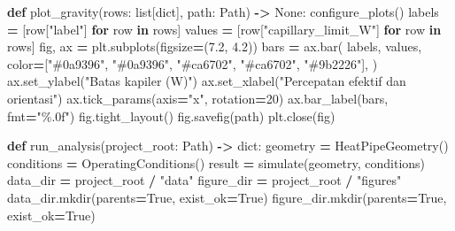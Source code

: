\documentclass[
  12pt,a4paper,oneside]{report}
\newenvironment{Shaded}{\begin{snugshade}}{\end{snugshade}}
\newcommand{\BuiltInTok}[1]{#1}
\newcommand{\ControlFlowTok}[1]{\textcolor[rgb]{0.13,0.29,0.53}{\textbf{#1}}}
\newcommand{\DecValTok}[1]{\textcolor[rgb]{0.00,0.00,0.81}{#1}}
\newcommand{\FloatTok}[1]{\textcolor[rgb]{0.00,0.00,0.81}{#1}}
\newcommand{\KeywordTok}[1]{\textcolor[rgb]{0.13,0.29,0.53}{\textbf{#1}}}
\newcommand{\NormalTok}[1]{#1}
\newcommand{\OperatorTok}[1]{\textcolor[rgb]{0.81,0.36,0.00}{\textbf{#1}}}
\newcommand{\StringTok}[1]{\textcolor[rgb]{0.31,0.60,0.02}{#1}}
\newcommand{\VariableTok}[1]{\textcolor[rgb]{0.00,0.00,0.00}{#1}}
\begin{document}
\begin{Shaded}
\begin{Highlighting}[]
\KeywordTok{def}\NormalTok{ plot\_gravity(rows: }\BuiltInTok{list}\NormalTok{[}\BuiltInTok{dict}\NormalTok{], path: Path) }\OperatorTok{{-}\textgreater{}} \VariableTok{None}\NormalTok{:}
\NormalTok{    configure\_plots()}
\NormalTok{    labels }\OperatorTok{=}\NormalTok{ [row[}\StringTok{"label"}\NormalTok{] }\ControlFlowTok{for}\NormalTok{ row }\KeywordTok{in}\NormalTok{ rows]}
\NormalTok{    values }\OperatorTok{=}\NormalTok{ [row[}\StringTok{"capillary\_limit\_W"}\NormalTok{] }\ControlFlowTok{for}\NormalTok{ row }\KeywordTok{in}\NormalTok{ rows]}
\NormalTok{    fig, ax }\OperatorTok{=}\NormalTok{ plt.subplots(figsize}\OperatorTok{=}\NormalTok{(}\FloatTok{7.2}\NormalTok{, }\FloatTok{4.2}\NormalTok{))}
\NormalTok{    bars }\OperatorTok{=}\NormalTok{ ax.bar(}
\NormalTok{        labels, values,}
\NormalTok{        color}\OperatorTok{=}\NormalTok{[}\StringTok{"\#0a9396"}\NormalTok{, }\StringTok{"\#0a9396"}\NormalTok{, }\StringTok{"\#ca6702"}\NormalTok{, }\StringTok{"\#ca6702"}\NormalTok{, }\StringTok{"\#9b2226"}\NormalTok{],}
\NormalTok{    )}
\NormalTok{    ax.set\_ylabel(}\StringTok{"Batas kapiler (W)"}\NormalTok{)}
\NormalTok{    ax.set\_xlabel(}\StringTok{"Percepatan efektif dan orientasi"}\NormalTok{)}
\NormalTok{    ax.tick\_params(axis}\OperatorTok{=}\StringTok{"x"}\NormalTok{, rotation}\OperatorTok{=}\DecValTok{20}\NormalTok{)}
\NormalTok{    ax.bar\_label(bars, fmt}\OperatorTok{=}\StringTok{"\%.0f"}\NormalTok{)}
\NormalTok{    fig.tight\_layout()}
\NormalTok{    fig.savefig(path)}
\NormalTok{    plt.close(fig)}


\KeywordTok{def}\NormalTok{ run\_analysis(project\_root: Path) }\OperatorTok{{-}\textgreater{}} \BuiltInTok{dict}\NormalTok{:}
\NormalTok{    geometry }\OperatorTok{=}\NormalTok{ HeatPipeGeometry()}
\NormalTok{    conditions }\OperatorTok{=}\NormalTok{ OperatingConditions()}
\NormalTok{    result }\OperatorTok{=}\NormalTok{ simulate(geometry, conditions)}
\NormalTok{    data\_dir }\OperatorTok{=}\NormalTok{ project\_root }\OperatorTok{/} \StringTok{"data"}
\NormalTok{    figure\_dir }\OperatorTok{=}\NormalTok{ project\_root }\OperatorTok{/} \StringTok{"figures"}
\NormalTok{    data\_dir.mkdir(parents}\OperatorTok{=}\VariableTok{True}\NormalTok{, exist\_ok}\OperatorTok{=}\VariableTok{True}\NormalTok{)}
\NormalTok{    figure\_dir.mkdir(parents}\OperatorTok{=}\VariableTok{True}\NormalTok{, exist\_ok}\OperatorTok{=}\VariableTok{True}\NormalTok{)}


\end{Highlighting}
\end{Shaded}
\end{document}
